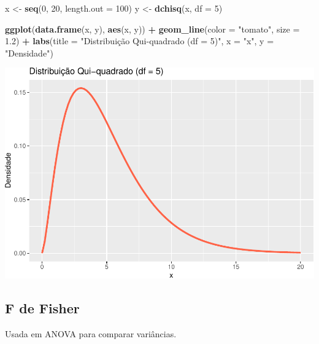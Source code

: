 \documentclass[
]{book}
\newenvironment{Shaded}{\begin{snugshade}}{\end{snugshade}}
\newcommand{\AttributeTok}[1]{\textcolor[rgb]{0.13,0.29,0.53}{#1}}
\newcommand{\DecValTok}[1]{\textcolor[rgb]{0.00,0.00,0.81}{#1}}
\newcommand{\FloatTok}[1]{\textcolor[rgb]{0.00,0.00,0.81}{#1}}
\newcommand{\FunctionTok}[1]{\textcolor[rgb]{0.13,0.29,0.53}{\textbf{#1}}}
\newcommand{\NormalTok}[1]{#1}
\newcommand{\OtherTok}[1]{\textcolor[rgb]{0.56,0.35,0.01}{#1}}
\newcommand{\SpecialCharTok}[1]{\textcolor[rgb]{0.81,0.36,0.00}{\textbf{#1}}}
\newcommand{\StringTok}[1]{\textcolor[rgb]{0.31,0.60,0.02}{#1}}
\begin{document}
\begin{Shaded}
\begin{Highlighting}[]
\NormalTok{x }\OtherTok{\textless{}{-}} \FunctionTok{seq}\NormalTok{(}\DecValTok{0}\NormalTok{, }\DecValTok{20}\NormalTok{, }\AttributeTok{length.out =} \DecValTok{100}\NormalTok{)}
\NormalTok{y }\OtherTok{\textless{}{-}} \FunctionTok{dchisq}\NormalTok{(x, }\AttributeTok{df =} \DecValTok{5}\NormalTok{)}

\FunctionTok{ggplot}\NormalTok{(}\FunctionTok{data.frame}\NormalTok{(x, y), }\FunctionTok{aes}\NormalTok{(x, y)) }\SpecialCharTok{+}
  \FunctionTok{geom\_line}\NormalTok{(}\AttributeTok{color =} \StringTok{"tomato"}\NormalTok{, }\AttributeTok{size =} \FloatTok{1.2}\NormalTok{) }\SpecialCharTok{+}
  \FunctionTok{labs}\NormalTok{(}\AttributeTok{title =} \StringTok{"Distribuição Qui{-}quadrado (df = 5)"}\NormalTok{, }\AttributeTok{x =} \StringTok{"x"}\NormalTok{, }\AttributeTok{y =} \StringTok{"Densidade"}\NormalTok{)}
\end{Highlighting}
\end{Shaded}

\includegraphics{LivroEstatisticaR_files/figure-latex/chisqDist-1.pdf}

\subsection{F de Fisher}\label{f-de-fisher}

Usada em ANOVA para comparar variâncias.
\end{document}
